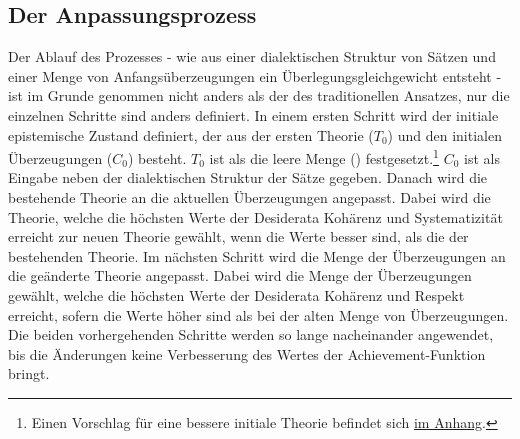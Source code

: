 \documentclass{article}
\begin{document}
\subsection{Der Anpassungsprozess}
Der Ablauf des Prozesses - wie aus einer dialektischen Struktur von Sätzen und einer Menge von Anfangsüberzeugungen ein Überlegungsgleichgewicht entsteht - ist im Grunde genommen nicht anders als der des traditionellen Ansatzes, nur die einzelnen Schritte sind anders definiert. In einem ersten Schritt wird der initiale epistemische Zustand definiert, der aus der ersten Theorie ($T_0$) und den initialen Überzeugungen ($C_0$) besteht. $T_0$ ist als die leere Menge ({}) festgesetzt.\footnote{Einen Vorschlag für eine bessere initiale Theorie befindet sich \hyperref[better-first-theory]{im Anhang}.} $C_0$ ist als Eingabe neben der dialektischen Struktur der Sätze gegeben. Danach wird die bestehende Theorie an die aktuellen Überzeugungen angepasst. Dabei wird die Theorie, welche die höchsten Werte der Desiderata Kohärenz und Systematizität erreicht zur neuen Theorie gewählt, wenn die Werte besser sind, als die der bestehenden Theorie. Im nächsten Schritt wird die Menge der Überzeugungen an die geänderte Theorie angepasst. Dabei wird die Menge der Überzeugungen gewählt, welche die höchsten Werte der Desiderata Kohärenz und Respekt erreicht, sofern die Werte höher sind als bei der alten Menge von Überzeugungen. Die beiden vorhergehenden Schritte werden so lange nacheinander angewendet, bis die Änderungen keine Verbesserung des Wertes der Achievement-Funktion bringt.
\end{document}
